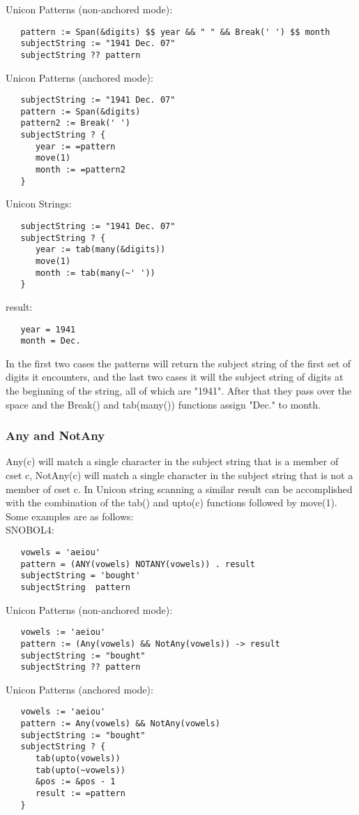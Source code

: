 \documentclass{article}
\begin{document}
\noindent
Unicon Patterns (non-anchored mode):
\begin{verbatim}
   pattern := Span(&digits) $$ year && " " && Break(' ') $$ month
   subjectString := "1941 Dec. 07"
   subjectString ?? pattern
\end{verbatim}
\noindent
Unicon Patterns (anchored mode):
\begin{verbatim}
   subjectString := "1941 Dec. 07"
   pattern := Span(&digits)
   pattern2 := Break(' ')
   subjectString ? {
      year := =pattern
      move(1)
      month := =pattern2
   }
\end{verbatim}

\noindent
Unicon Strings:
\begin{verbatim}
   subjectString := "1941 Dec. 07"
   subjectString ? {
      year := tab(many(&digits))
      move(1)
      month := tab(many(~' '))
   }
\end{verbatim}

\noindent
result:
\begin{verbatim}
   year = 1941
   month = Dec.
\end{verbatim}

In the first two cases the patterns will return the subject string of the first set of digits it encounters, and the last two cases it will the subject string of digits at the beginning of the string, all of which are "1941".  After that they pass over the space and the Break() and tab(many()) functions assign "Dec." to month.

\vspace{2 pc}
\subsubsection{Any and NotAny}
Any(c) will match a single character in the subject string that is a member of cset c, NotAny(c) will match a single character in the subject string that is not a member of cset c.  In Unicon string scanning a similar result can be accomplished with the combination of the tab() and upto(c) functions followed by move(1). Some examples are as follows: \\

\noindent
SNOBOL4:
\begin{verbatim}
   vowels = 'aeiou'
   pattern = (ANY(vowels) NOTANY(vowels)) . result
   subjectString = 'bought'
   subjectString  pattern
\end{verbatim}

\noindent
Unicon Patterns (non-anchored mode):
\begin{verbatim}
   vowels := 'aeiou'
   pattern := (Any(vowels) && NotAny(vowels)) -> result
   subjectString := "bought"
   subjectString ?? pattern
\end{verbatim}
\noindent
Unicon Patterns (anchored mode):
\begin{verbatim}
   vowels := 'aeiou'
   pattern := Any(vowels) && NotAny(vowels)
   subjectString := "bought"
   subjectString ? {
      tab(upto(vowels))
      tab(upto(~vowels))
      &pos := &pos - 1
      result := =pattern
   }
\end{verbatim}
\end{document}
